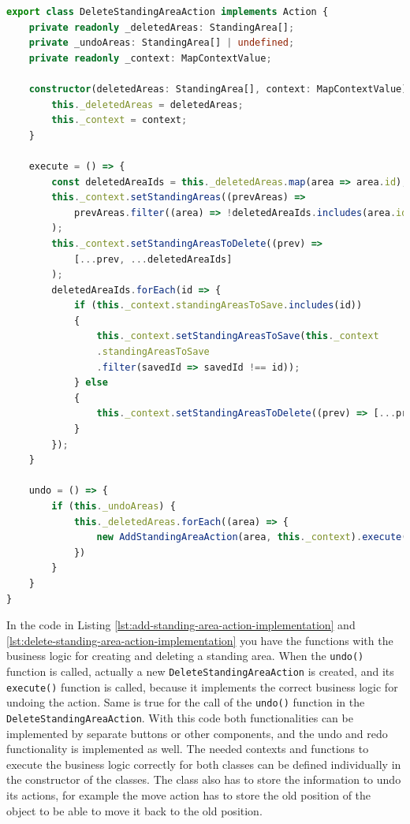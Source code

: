\begin{lstlisting}[language=TypeScript,caption={Delete standing-area action implementation},label={lst:delete-standing-area-action-implementation}]
export class DeleteStandingAreaAction implements Action {
    private readonly _deletedAreas: StandingArea[];
    private _undoAreas: StandingArea[] | undefined;
    private readonly _context: MapContextValue;

    constructor(deletedAreas: StandingArea[], context: MapContextValue) {
        this._deletedAreas = deletedAreas;
        this._context = context;
    }

    execute = () => {
        const deletedAreaIds = this._deletedAreas.map(area => area.id);
        this._context.setStandingAreas((prevAreas) =>
            prevAreas.filter((area) => !deletedAreaIds.includes(area.id))
        );
        this._context.setStandingAreasToDelete((prev) => 
            [...prev, ...deletedAreaIds]
        );
        deletedAreaIds.forEach(id => {
            if (this._context.standingAreasToSave.includes(id)) 
            {
                this._context.setStandingAreasToSave(this._context
                .standingAreasToSave
                .filter(savedId => savedId !== id));
            } else 
            {
                this._context.setStandingAreasToDelete((prev) => [...prev, id]);
            }
        });
    }

    undo = () => {
        if (this._undoAreas) {
            this._deletedAreas.forEach((area) => {
                new AddStandingAreaAction(area, this._context).execute()
            })
        }
    }
}
\end{lstlisting}

In the code in Listing \ref{lst:add-standing-area-action-implementation} and \ref{lst:delete-standing-area-action-implementation} you have the functions with the business logic for creating and deleting a standing area. When the \texttt{undo()} function is called, actually a new \texttt{DeleteStandingAreaAction} is created, and its \texttt{execute()} function is called, because it implements the correct business logic for undoing the action. Same is true for the call of the \texttt{undo()} function in the \texttt{DeleteStandingAreaAction}. With this code both functionalities can be implemented by separate buttons or other components, and the undo and redo functionality is implemented as well. The needed contexts and functions to execute the business logic correctly for both classes can be defined individually in the constructor of the classes. The class also has to store the information to undo its actions, for example the move action has to store the old position of the object to be able to move it back to the old position.

